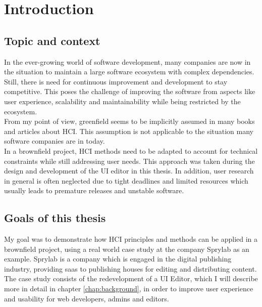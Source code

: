 %
\chapter{Introduction}
\label{chap:introduction}

\section{Topic and context}

In the ever-growing world of software development, many companies are now in the situation to maintain a large software ecosystem with complex dependencies.
Still, there is need for continuous improvement and development to stay competitive.
This poses the challenge of improving the software from aspects like user experience, scalability and maintainability while being restricted by the ecosystem.
\\
From my point of view, \Gls{greenfield} seems to be implicitly assumed in many books and articles about HCI.
This assumption is not applicable to the situation many software companies are in today.
\\
In a brownfield project, HCI methods need to be adapted to account for technical constraints while still addressing user needs. This approach was taken during the design and development of the UI editor in this thesis.
In addition, user research in general is often neglected due to tight deadlines and limited resources which usually leads to premature releases and unstable software.
\section{Goals of this thesis}
My goal was to demonstrate how HCI principles and methods can be applied in a brownfield project, using a real world case study at the company Sprylab as an example.
Sprylab is a company which is engaged in the digital publishing industry, providing \Gls{saas} to publishing houses for editing and distributing content.
The case study consists of the redevelopment of a UI Editor, which I will describe more in detail in chapter \ref{chap:background}, in order to improve user experience and usability for web developers, admins and editors.


